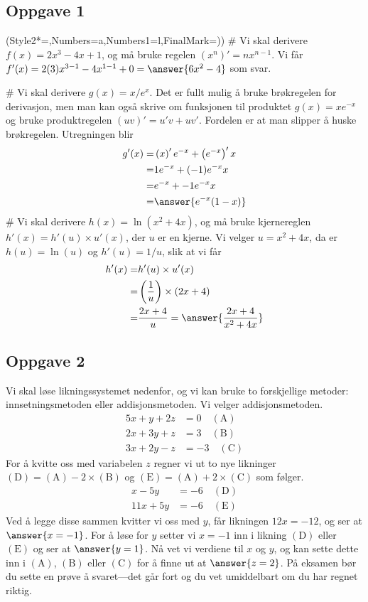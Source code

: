 \subsection*{Oppgave 1}
\begin{easylist}[enumerate]
\ListProperties(Style2*=,Numbers=a,Numbers1=l,FinalMark={)})
# Vi skal derivere $f(x) = 2x^3 - 4x + 1$, og må bruke regelen $\left(x^n\right)' = nx^{n-1}$.
Vi får $f'(x) = 2(3)x^{3-1} - 4 x ^{1-1} + 0 = \answer{6x^2 - 4}$ som svar.

# Vi skal derivere $g(x) = x / e^x$. Det er fullt mulig å bruke brøkregelen for derivasjon, men man kan også skrive om funksjonen til produktet $g(x) = x e^{-x}$ og bruke produktregelen $(uv)' = u'v + uv'$.
Fordelen er at man slipper å huske brøkregelen.
Utregningen blir
\begin{align*}
	g'(x) =& \left(x \right)' e^{-x} + \left( e^{-x} \right)' x \\
	=& 1 e^{-x} + (-1)e^{-x}  x \\
	=& e^{-x} + -1e^{-x}  x \\
	=& \answer{e^{-x}(1 - x)}
\end{align*}
# Vi skal derivere $h(x) = \ln \left( x^2 + 4x\right)$, og må bruke kjernereglen $h'(x) = h'(u) \times u'(x)$, der $u$ er en kjerne.
Vi velger $u =x^2 + 4x$, da er $h(u) = \ln(u)$ og $h'(u) = 1/u$, slik at vi får
\begin{align*}
	h'(x) =& h'(u) \times u'(x) \\
	=& \left( \frac{1}{u}  \right) \times \left( 2x + 4 \right) \\
	=& \frac{2x + 4}{u} =  \answer{\frac{2x + 4}{x^2 + 4x}}
\end{align*}
\end{easylist}

\subsection*{Oppgave 2}
Vi skal løse likningssystemet nedenfor, og vi kan bruke to forskjellige metoder: innsetningsmetoden eller addisjonsmetoden.
Vi velger addisjonsmetoden.
\begin{align*}
	5 x + y + 2 z &= 0 \quad (\text{A})\\
	2 x + 3 y + z &= 3 \quad (\text{B})\\
	3 x + 2 y - z &= -3 \quad (\text{C})
\end{align*}
For å kvitte oss med variabelen $z$ regner vi ut to nye likninger $(\text{D}) = (\text{A}) - 2 \times (\text{B})$ og $(\text{E}) = (\text{A}) + 2 \times (\text{C})$ som følger.
\begin{align*}
	x - 5y  &= -6 \quad (\text{D})\\
	11 x + 5 y  &= -6 \quad (\text{E})
\end{align*}
Ved å legge disse sammen kvitter vi oss med $y$, får likningen $12x = -12$, og ser at $\answer{x = -1}$.
For å løse for $y$ setter vi $x=-1$ inn i likning $(\text{D})$ eller $(\text{E})$ og ser at $\answer{y = 1}$.
Nå vet vi verdiene til $x$ og $y$, og kan sette dette inn i $(\text{A})$, $(\text{B})$ eller $(\text{C})$ for å finne ut at $\answer{z = 2}$.
På eksamen bør du sette en prøve å svaret---det går fort og du vet umiddelbart om du har regnet riktig.


